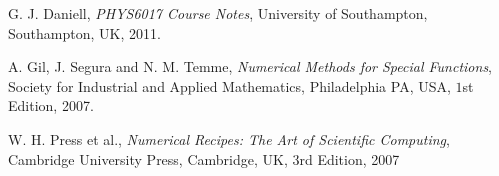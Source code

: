\documentclass[]{article}
\begin{document}
\begin{thebibliography}{9}
  G. J. Daniell,
  \emph{PHYS6017 Course Notes},
  University of Southampton, Southampton, UK,
  2011.
  
  A. Gil, J. Segura and N. M. Temme,
  \emph{Numerical Methods for Special Functions},
  Society for Industrial and Applied Mathematics, Philadelphia PA, USA,
  $1$st Edition,
  2007.
  
  W. H. Press et al.,
  \emph{Numerical Recipes: The Art of Scientific Computing},
  Cambridge University Press, Cambridge, UK,
  $3$rd Edition,
  2007
  
\end{thebibliography}
\end{document}
